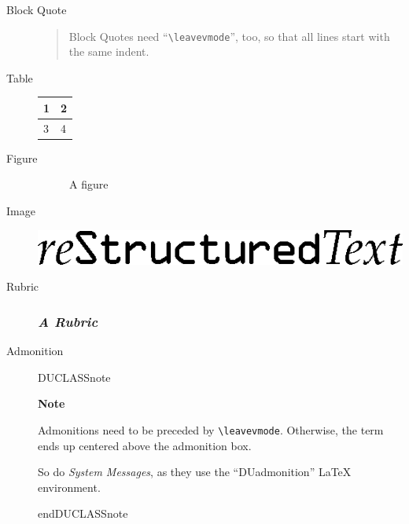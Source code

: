 \documentclass[a4paper]{article}
\newlength{\DUtablewidth} %
\newenvironment{DUclass}[1]%
    {%
     \def\DocutilsClassFunctionName{DUCLASS#1}
     \csname \DocutilsClassFunctionName \endcsname}%
    {\csname end\DocutilsClassFunctionName \endcsname}%
\newenvironment{DUadmonition}%
    {\begin{center}
       \begin{lrbox}{\DUadmonitionbox}
         \begin{minipage}{0.9\linewidth}
    }%
    {    \end{minipage}
       \end{lrbox}
       \fbox{\usebox{\DUadmonitionbox}}
     \end{center}
    }
\providecommand*{\DUrubric}[1]{\subsubsection*{\emph{#1}}}
\providecommand*{\DUtitle}[1]{%
  \smallskip\noindent\textbf{#1}\smallskip}
\begin{document}
\begin{description}
\item[{Block Quote}] \leavevmode
% 

\begin{quote}
Block Quotes need “\texttt{\textbackslash{}leavevmode}”, too,
so that all lines start with the same indent.
\end{quote}

\item[{Table}] \leavevmode
\setlength{\DUtablewidth}{\linewidth}%
\begin{longtable*}{|p{0.051\DUtablewidth}|p{0.051\DUtablewidth}|}
\hline

1
 & 
2
 \\
\hline

3
 & 
4
 \\
\hline
\end{longtable*}

\item[{Figure}] \leavevmode
\begin{figure}
\noindent{}
\caption{A figure}
\end{figure}

\item[{Image}] \leavevmode

\includegraphics{../../../docs/user/rst/images/title.png}

\item[{Rubric}] \leavevmode
\DUrubric{A Rubric}

\item[{Admonition}] \leavevmode
\begin{DUclass}{note}
\begin{DUadmonition}
\DUtitle{Note}

Admonitions need to be preceded by \texttt{\textbackslash{}leavevmode}.
Otherwise, the term ends up centered above the admonition box.

So do \emph{System Messages}, as they use the “DUadmonition”
LaTeX environment.
\end{DUadmonition}
\end{DUclass}
\end{description}
\end{document}
